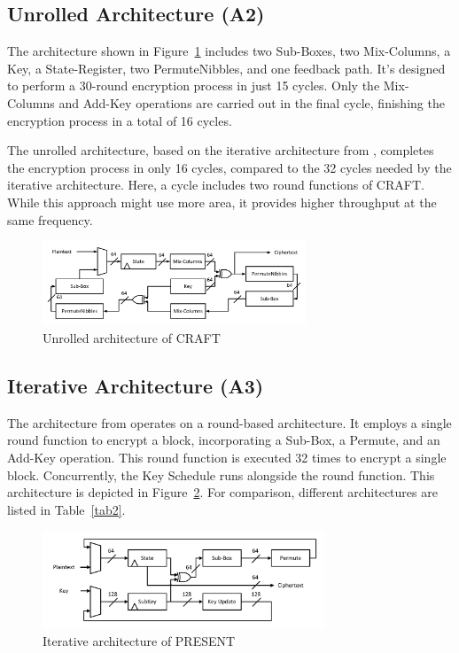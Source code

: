 \documentclass[final,5p,times,twocolumn]{elsarticle}
\begin{document}
\subsection{Unrolled Architecture (A2)}\label{subsec3}

The architecture shown in Figure~\ref{fig4} includes two Sub-Boxes, two Mix-Columns, a Key, a State-Register, two PermuteNibbles, and one feedback path. It's designed to perform a 30-round encryption process in just 15 cycles. Only the Mix-Columns and Add-Key operations are carried out in the final cycle, finishing the encryption process in a total of 16 cycles.

The unrolled architecture, based on the iterative architecture from \cite{Beierle2019}, completes the encryption process in only 16 cycles, compared to the 32 cycles needed by the iterative architecture. Here, a cycle includes two round functions of CRAFT. While this approach might use more area, it provides higher throughput at the same frequency.


\begin{figure}[h]%
    \centering
    \includegraphics[width=0.7\textwidth]{./fig/unrolled-archticture.pdf}
    \caption{Unrolled architecture of CRAFT}\label{fig4}
\end{figure}

\subsection{Iterative Architecture (A3)}\label{iterative_architecture}

The architecture from \cite{Bharathi2022} operates on a round-based architecture.
It employs a single round function to encrypt a block, incorporating a Sub-Box, a Permute, and an Add-Key operation.
This round function is executed 32 times to encrypt a single block. Concurrently, the Key Schedule runs alongside the round function.
This architecture is depicted in Figure~\ref{fig5}.
For comparison, different architectures are listed in Table~\ref{tab2}.

\begin{figure}
    \centering
    \includegraphics[width=0.75\textwidth]{./fig/iteration-present.pdf}
    \caption{Iterative architecture of PRESENT}\label{fig5}
\end{figure}
\end{document}
